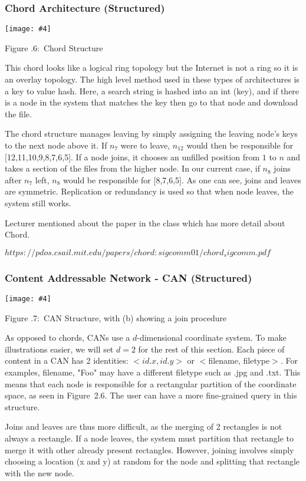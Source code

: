 \documentclass[twoside]{article}
\newcounter{lecnum}
\newcommand{\fig}[4]{
            \centerline{\texttt{[image: \#4]}}
            \begin{center}
            Figure \thelecnum.#1:~#3
            \end{center}
    }
\begin{document}
\subsubsection{Chord Architecture (Structured)}
\fig{6}{0.5}{Chord Structure}{chord.png}
This chord looks like a logical ring topology but the Internet is not a ring so it is an overlay topology. The high level method used in these types of architectures is a key to value hash. Here, a search string is hashed into an int (key), and if there is a node in the system that matches the key then go to that node and download the file. 

The chord structure manages leaving by simply assigning the leaving node's keys to the next node above it. If $n_7$ were to leave, $n_{12}$ would then be responsible for [12,11,10,9,8,7,6,5]. If a node joins, it chooses an unfilled position from $1$ to $n$ and takes a section of the files from the higher node. In our current case, if $n_8$ joins after $n_7$ left, $n_8$ would be responsible for [8,7,6,5]. As one can see, joins and leaves are symmetric. Replication or redundancy is used so that when node leaves, the system still works.

Lecturer mentioned about the paper in the class which has more detail about Chord.  

$https://pdos.csail.mit.edu/papers/chord:sigcomm01/chord_sigcomm.pdf$

\subsubsection{Content Addressable Network - CAN (Structured)}
\fig{7}{0.5}{CAN Structure, with (b) showing a join procedure}{can.png}
As opposed to chords, CANs use a $d$-dimensional coordinate system. To make illustrations easier, we will set $d=2$ for the rest of this section. Each piece of content in a CAN has 2 identities: $<id.x,id.y>$ or $<$filename, filetype$>$. For examples, filename, "Foo" may have a different filetype such as .jpg and .txt. This means that each node is responsible for a rectangular partition of the coordinate space, as seen in Figure~2.6. The user can have a more fine-grained query in this structure.

Joins and leaves are thus more difficult, as the merging of 2 rectangles is not always a rectangle. If a node leaves, the system must partition that rectangle to merge it with other already present rectangles. However, joining involves simply choosing a location (x and y) at random for the node and splitting that rectangle with the new node.
\end{document}
